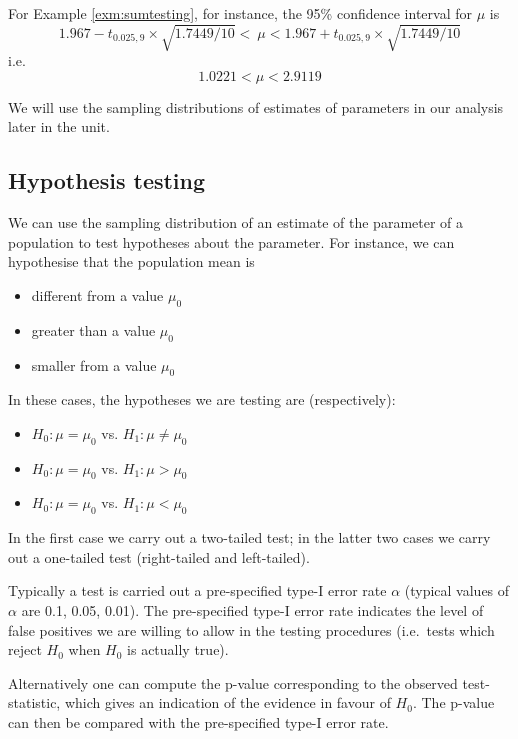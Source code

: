 \documentclass[12pt,a4paper,openany,twoside]{report}
\theoremstyle{definition}
\theoremstyle{remark}
\theoremstyle{plain}
\newcommand{\vsps}{\vspace{.5cm}}
\theoremstyle{definition}
\theoremstyle{definition}
\theoremstyle{definition}
\theoremstyle{remark}
\let\BeginKnitrBlock\begin \let\EndKnitrBlock\end
\begin{document}
\BeginKnitrBlock{example}[Confidence interval example]
\protect\hypertarget{exm:sumtestCI}{}{\label{exm:sumtestCI} {} }For Example \ref{exm:sumtesting}, for instance, the 95\% confidence interval for \(\mu\) is
\[ 1.967 - t_{0.025,9}\times\sqrt{1.7449/10} < \ \mu < 1.967 + t_{0.025,9}\times\sqrt{1.7449/10} \]
i.e.
\[1.0221 < \mu < 2.9119\]
\EndKnitrBlock{example}
\vsps

We will use the sampling distributions of estimates of parameters in our analysis later in the unit.

\hypertarget{hyptest}{%
\subsection{Hypothesis testing}\label{hyptest}}

We can use the sampling distribution of an estimate of the parameter of a population to test hypotheses about the parameter.
For instance, we can hypothesise that the population mean is

\begin{itemize}
\item
  different from a value \(\mu_0\)
\item
  greater than a value \(\mu_0\)
\item
  smaller from a value \(\mu_0\)
\end{itemize}

In these cases, the hypotheses we are testing are (respectively):

\begin{itemize}
\item
  \(H_0: \mu = \mu_0\) vs. \(H_1: \mu \neq \mu_0\)
\item
  \(H_0: \mu = \mu_0\) vs. \(H_1: \mu > \mu_0\)
\item
  \(H_0: \mu = \mu_0\) vs. \(H_1: \mu < \mu_0\)
\end{itemize}

In the first case we carry out a two-tailed test; in the latter two cases we carry out a one-tailed test (right-tailed and left-tailed).

Typically a test is carried out a pre-specified type-I error rate \(\alpha\) (typical values of \(\alpha\) are 0.1, 0.05, 0.01).
The pre-specified type-I error rate indicates the level of false positives we are willing to allow in the testing procedures (i.e.~tests which reject \(H_0\) when \(H_0\) is actually true).

Alternatively one can compute the p-value corresponding to the observed test-statistic, which gives an indication of the evidence in favour of \(H_0\).
The p-value can then be compared with the pre-specified type-I error rate.
\end{document}
